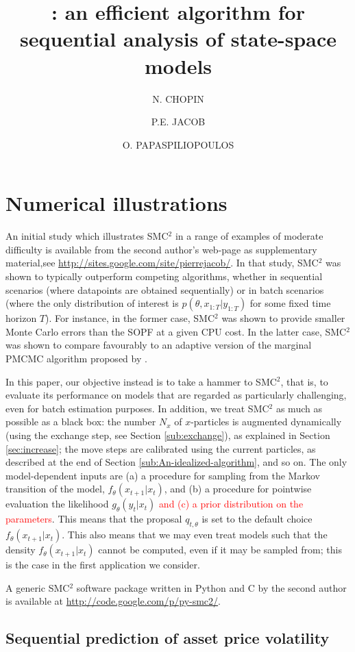\documentclass{statsoc}
\title[\SMCSQ]{\SMCSQ: an efficient algorithm for  sequential analysis of state-space models}
\author[Chopin et al.]{N. CHOPIN}
\author[Chopin et al.]{P.E. JACOB}
\author[Chopin et al.]{O. PAPASPILIOPOULOS}
\newcommand{\SMCSQ}{SMC$^2$\xspace}
\begin{document}
\section{Numerical illustrations}\label{sec:numerics}


An initial study which illustrates \SMCSQ in a range of examples 
of moderate difficulty is available from the second author's web-page as supplementary 
material,see 
\href{http://sites.google.com/site/pierrejacob/}{http://sites.google.com/site/pierrejacob/}. 
In that study, \SMCSQ was shown to 
typically outperform competing algorithms, whether in sequential
scenarios (where datapoints are obtained sequentially)
or in batch scenarios (where the only distribution of interest
is $p(\theta,x_{1:T}|y_{1:T})$ for some fixed time horizon $T$). 
For instance, in the former case,  \SMCSQ was shown to provide  smaller Monte Carlo errors
than the SOPF at a given CPU cost. In the latter case, 
\SMCSQ was shown to compare favourably to an adaptive version of the marginal
PMCMC algorithm proposed by \citet{PetersHosackHayes}. 

In this paper, our objective instead is to take a hammer to \SMCSQ, 
that is, to evaluate its performance on models that are regarded
as particularly challenging, even for batch estimation purposes. 
In addition, we treat \SMCSQ as much as possible as a black box: 
the number $N_x$ of $x$-particles is augmented dynamically (using the exchange step, see
Section \ref{sub:exchange}), as explained
in Section \ref{sec:increase}; the move steps are calibrated using the current particles, as 
described at the end of Section \ref{sub:An-idealized-algorithm}, and so on.  
The only model-dependent inputs are (a) a procedure
for sampling from the Markov transition of the model, $f_\theta(x_{t+1}|x_t)$,  and 
(b) a procedure for pointwise evaluation the likelihood $g_\theta(y_t|x_t)$
\textcolor{red}{and (c) a prior distribution on the parameters}. 
This means that the proposal $q_{t,\theta}$ is set to the default
choice $f_\theta(x_{t+1}|x_t)$. This also means that we may even 
treat models such that the density  $f_\theta(x_{t+1}|x_t)$ cannot be 
computed, even if it may be sampled from; this is the case
in the first application we consider. 

A generic \SMCSQ software package written in Python and C by the second author is available at 
\href{http://code.google.com/p/py-smc2/}{http://code.google.com/p/py-smc2/}. 

\subsection{Sequential prediction of asset price volatility}
\end{document}
